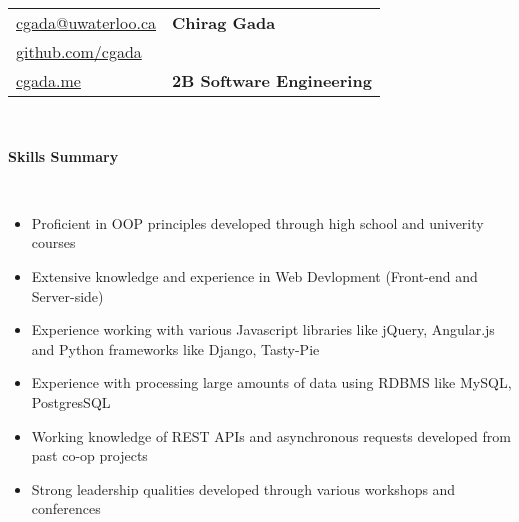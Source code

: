 \documentclass[letterpaper,11pt]{article}
\newcommand{\resheading}[1]{{\large \colorbox{mygrey}{\begin{minipage}{\textwidth}{\textbf{#1 \vphantom{p\^{E}}}}\end{minipage}}}}
\begin{document}
\newcommand{\mywebheader}{
\begin{tabular*}{7in}{l@{\extracolsep{\fill}}l }
	  \href{mailto:cgada@uwaterloo.ca}{\Large cgada@uwaterloo.ca}&\textbf{\Huge \hfill Chirag Gada}\\
	  \href{http://www.github.com/cgada}{\large github.com/cgada}\\
	 \href{http://cgada.me}{\large cgada.me}&\textbf{ \Large \hfill 2B Software Engineering}\\
	\end{tabular*}
\\ 
\vspace{0.3in}}

\mywebheader

\resheading{Skills Summary}
\\[20pt]
	\begin{itemize} \itemsep -1pt   
		\item 
			{Proficient in OOP principles developed through high school and univerity courses}
		\item
			{Extensive knowledge and experience in Web Devlopment (Front-end and Server-side)}		
		\item 
			{Experience working with various Javascript libraries like jQuery, Angular.js and Python frameworks like Django, Tasty-Pie }		
		\item
			{Experience with processing large amounts of data using RDBMS like MySQL, PostgresSQL}
		\item
			{Working knowledge of REST APIs and asynchronous requests developed from past co-op projects} 
		\item
			{Strong leadership qualities developed through various workshops and conferences}  

	\end{itemize} %
\end{document}

